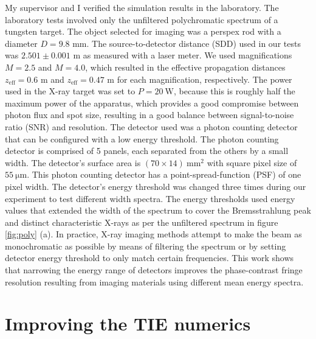 \documentclass[10pt, a4paper, singlespacing]{report}
\begin{document}
My supervisor and I verified the simulation results in the laboratory. The laboratory tests involved only the unfiltered polychromatic spectrum of a tungsten target. The object selected for imaging was a perspex rod with a diameter $D = 9.8$ mm. The source-to-detector distance (SDD) used in our tests was $2.501 \pm 0.001$ m as measured with a laser meter. We used magnifications $M = 2.5$ and $M = 4.0$, which resulted in the effective propagation distances $z_{\mathrm{eff}} = 0.6$ m and $z_{\mathrm{eff}} = 0.47$ m for each magnification, respectively. The power used in the X-ray target was set to $P = 20~\mathrm{W}$, because this is roughly half the maximum power of the apparatus, which provides a good compromise between photon flux and spot size, resulting in a good balance between signal-to-noise ratio (SNR) and resolution. The detector used was a photon counting detector that can be configured with a low energy threshold. 
The photon counting detector is comprised of 5 panels, each separated from the others by a small width. The detector's surface area is $(70\times14)~\mathrm{mm}^2$ with square pixel size of $55~\mathrm{\mu m}$. This photon counting detector has a point-spread-function (PSF) of one pixel width.
The detector's energy threshold was changed three times during our experiment to test different width spectra. The energy thresholds used energy values that extended the width of the spectrum to cover the Bremsstrahlung peak and distinct characteristic X-rays as per the unfiltered spectrum in figure \ref{fig:poly} (a).
In practice, X-ray imaging methods attempt to make the beam as monochromatic as possible by means of filtering the spectrum or by setting detector energy threshold to only match certain frequencies. This work shows that narrowing the energy range of detectors improves the phase-contrast fringe resolution resulting from imaging materials using different mean energy spectra.



\section{Improving the TIE numerics}\label{TIE+RK}
\end{document}
